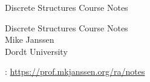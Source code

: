 \documentclass[oneside,10pt,]{book}
\newcommand{\titlepagefont}{\relax}
\begin{document}
\raggedbottom
\frontmatter
\thispagestyle{empty}
{\titlepagefont\centering
\vspace*{0.28\textheight}
{\Huge Discrete Structures Course Notes}\\}
\clearpage
\thispagestyle{empty}
{\titlepagefont\centering
\vspace*{0.14\textheight}
{\Huge Discrete Structures Course Notes}\\[3\baselineskip]
{\Large Mike Janssen}\\[0.5\baselineskip]
{\Large Dordt University}\\}
\clearpage
\thispagestyle{empty}
\hypertarget{g:colophon:idp105545029983376}{}
: \href{https:\slash{}\slash{}prof.mkjanssen.org\slash{}ra\slash{}notes}{https:\slash{}\slash{}prof.mkjanssen.org\slash{}ra\slash{}notes}\par\medskip
{}
\null\clearpage
\setcounter{tocdepth}{1}
\renewcommand*\contentsname{Contents}
\tableofcontents
\mainmatter
%
%
\typeout{************************************************}
\typeout{************************************************}
%
\end{document}
